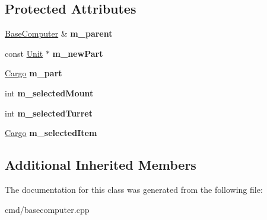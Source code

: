 \subsection*{Protected Attributes}
\begin{DoxyCompactItemize}
\item 
\hyperlink{classBaseComputer}{Base\+Computer} \& {\bfseries m\+\_\+parent}\hypertarget{classBaseComputer_1_1UpgradeOperation_acfb00ccb205585c154c9ab84756458b7}{}\label{classBaseComputer_1_1UpgradeOperation_acfb00ccb205585c154c9ab84756458b7}

\item 
const \hyperlink{classUnit}{Unit} $\ast$ {\bfseries m\+\_\+new\+Part}\hypertarget{classBaseComputer_1_1UpgradeOperation_a864af08ca00d2ef1bdfec956af634597}{}\label{classBaseComputer_1_1UpgradeOperation_a864af08ca00d2ef1bdfec956af634597}

\item 
\hyperlink{classCargo}{Cargo} {\bfseries m\+\_\+part}\hypertarget{classBaseComputer_1_1UpgradeOperation_af5d9e5c52d19830a83f1200f72773693}{}\label{classBaseComputer_1_1UpgradeOperation_af5d9e5c52d19830a83f1200f72773693}

\item 
int {\bfseries m\+\_\+selected\+Mount}\hypertarget{classBaseComputer_1_1UpgradeOperation_a14f8c15f9a405b63bac3fc7608c406c9}{}\label{classBaseComputer_1_1UpgradeOperation_a14f8c15f9a405b63bac3fc7608c406c9}

\item 
int {\bfseries m\+\_\+selected\+Turret}\hypertarget{classBaseComputer_1_1UpgradeOperation_aa183e1285ffdec3c36025bc2c8196ea3}{}\label{classBaseComputer_1_1UpgradeOperation_aa183e1285ffdec3c36025bc2c8196ea3}

\item 
\hyperlink{classCargo}{Cargo} {\bfseries m\+\_\+selected\+Item}\hypertarget{classBaseComputer_1_1UpgradeOperation_a33acdc4af46c10ea81a72c4f88e7a2ba}{}\label{classBaseComputer_1_1UpgradeOperation_a33acdc4af46c10ea81a72c4f88e7a2ba}

\end{DoxyCompactItemize}
\subsection*{Additional Inherited Members}


The documentation for this class was generated from the following file\+:\begin{DoxyCompactItemize}
\item 
cmd/basecomputer.\+cpp\end{DoxyCompactItemize}
